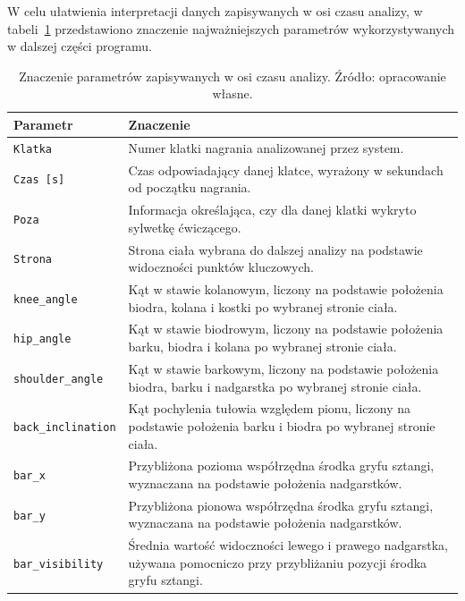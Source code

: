 W celu ułatwienia interpretacji danych zapisywanych w osi czasu analizy, w tabeli~\ref{tab:znaczenie-parametrow-osi-czasu} przedstawiono znaczenie najważniejszych parametrów wykorzystywanych w dalszej części programu.

\begin{table}[H]
\centering
\caption{Znaczenie parametrów zapisywanych w osi czasu analizy. Źródło: opracowanie własne.}
\label{tab:znaczenie-parametrow-osi-czasu}
\vspace{0.3cm}
\small
\begin{tabular}{p{4cm}p{10cm}}
\toprule
\textbf{Parametr} & \textbf{Znaczenie} \\
\midrule
\texttt{Klatka} & Numer klatki nagrania analizowanej przez system. \\

\texttt{Czas [s]} & Czas odpowiadający danej klatce, wyrażony w sekundach od początku nagrania. \\

\texttt{Poza} & Informacja określająca, czy dla danej klatki wykryto sylwetkę ćwiczącego. \\

\texttt{Strona} & Strona ciała wybrana do dalszej analizy na podstawie widoczności punktów kluczowych. \\

\texttt{knee\_angle} & Kąt w stawie kolanowym, liczony na podstawie położenia biodra, kolana i kostki po wybranej stronie ciała. \\

\texttt{hip\_angle} & Kąt w stawie biodrowym, liczony na podstawie położenia barku, biodra i kolana po wybranej stronie ciała. \\

\texttt{shoulder\_angle} & Kąt w stawie barkowym, liczony na podstawie położenia biodra, barku i nadgarstka po wybranej stronie ciała. \\

\texttt{back\_inclination} & Kąt pochylenia tułowia względem pionu, liczony na podstawie położenia barku i biodra po wybranej stronie ciała. \\

\texttt{bar\_x} & Przybliżona pozioma współrzędna środka gryfu sztangi, wyznaczana na podstawie położenia nadgarstków. \\

\texttt{bar\_y} & Przybliżona pionowa współrzędna środka gryfu sztangi, wyznaczana na podstawie położenia nadgarstków. \\

\texttt{bar\_visibility} & Średnia wartość widoczności lewego i prawego nadgarstka, używana pomocniczo przy przybliżaniu pozycji środka gryfu sztangi. \\
\bottomrule
\end{tabular}
\end{table}


